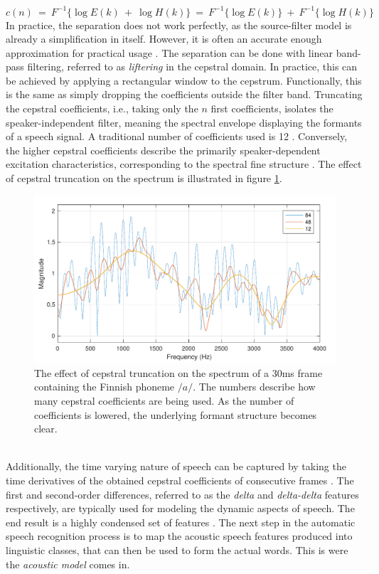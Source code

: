 \documentclass[english, 12pt, a4paper, pdftex, elec, utf8]{aaltothesis}
\begin{document}
\begin{equation}
c(n) \ = \ F^{-1} \big\{ \log E(k) \ + \ \log H(k) \big\} \ = \ F^{-1} \big\{\log  E(k) \big\} \ + \ F^{-1} \big\{\log H(k) \big\}
\end{equation}
In practice, the separation does not work perfectly, as the source-filter model is already a simplification in itself. However, it is often an accurate enough approximation for practical usage \cite[p.~314]{huang2001spoken}. The separation can be done with linear band-pass filtering, referred to as \textit{liftering} in the cepstral domain. In practice, this can be achieved by applying a rectangular window to the cepstrum. Functionally, this is the same as simply dropping the coefficients outside the filter band. Truncating the cepstral coefficients, i.e., taking only the $n$ first coefficients, isolates the speaker-independent filter, meaning the spectral envelope displaying the formants of a speech signal. A traditional number of coefficients used is 12 \cite{huang2001spoken, gales2008application}. Conversely, the higher cepstral coefficients describe the primarily speaker-dependent excitation characteristics, corresponding to the spectral fine structure \cite{gales2008application}. The effect of cepstral truncation on the spectrum is illustrated in figure \ref{fig:cepstrum}.
\begin{figure}[h]
	\centering
	\includegraphics[trim={0.1cm 0cm 0cm 0.4cm}, clip, width=\textwidth]{cepstrum.pdf}
	\caption{The effect of cepstral truncation on the spectrum of a 30ms frame containing the Finnish phoneme $/a/$. The numbers describe how many cepstral coefficients are being used. As the number of coefficients is lowered, the underlying formant structure becomes clear.}
	\label{fig:cepstrum} 
\end{figure} \\
Additionally, the time varying nature of speech can be captured by taking the time derivatives of the obtained cepstral coefficients of consecutive frames \cite{gales2008application, kallasjoki2016}. The first and second-order differences, referred to as the \textit{delta} and \textit{delta-delta} features respectively, are typically used for modeling the dynamic aspects of speech. The end result is a highly condensed set of features \cite{huang2001spoken, gales2008application}. The next step in the automatic speech recognition process is to map the acoustic speech features produced into linguistic classes, that can then be used to form the actual words. This is were the \textit{acoustic model} comes in.
\end{document}
